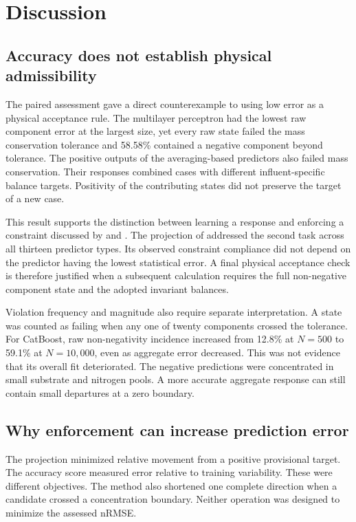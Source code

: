 \section{Discussion}
\label{sec:projection_discussion}

\subsection{Accuracy does not establish physical admissibility}

The paired assessment gave a direct counterexample to using low error as a physical acceptance rule. The multilayer perceptron had the lowest raw component error at the largest size, yet every raw state failed the mass conservation tolerance and 58.58\% contained a negative component beyond tolerance. The positive outputs of the averaging-based predictors also failed mass conservation. Their responses combined cases with different influent-specific balance targets. Positivity of the contributing states did not preserve the target of a new case.

This result supports the distinction between learning a response and enforcing a constraint discussed by \citet{Kashinath2021} and \citet{Hansen2024}. The projection of \citet{KircherVotsmeier2025} addressed the second task across all thirteen predictor types. Its observed constraint compliance did not depend on the predictor having the lowest statistical error. A final physical acceptance check is therefore justified when a subsequent calculation requires the full non-negative component state and the adopted invariant balances.

Violation frequency and magnitude also require separate interpretation. A state was counted as failing when any one of twenty components crossed the tolerance. For CatBoost, raw non-negativity incidence increased from 12.8\% at $N=500$ to 59.1\% at $N=10{,}000$, even as aggregate error decreased. This was not evidence that its overall fit deteriorated. The negative predictions were concentrated in small substrate and nitrogen pools. A more accurate aggregate response can still contain small departures at a zero boundary.

\subsection{Why enforcement can increase prediction error}

The projection minimized relative movement from a positive provisional target. The accuracy score measured error relative to training variability. These were different objectives. The method also shortened one complete direction when a candidate crossed a concentration boundary. Neither operation was designed to minimize the assessed nRMSE.

